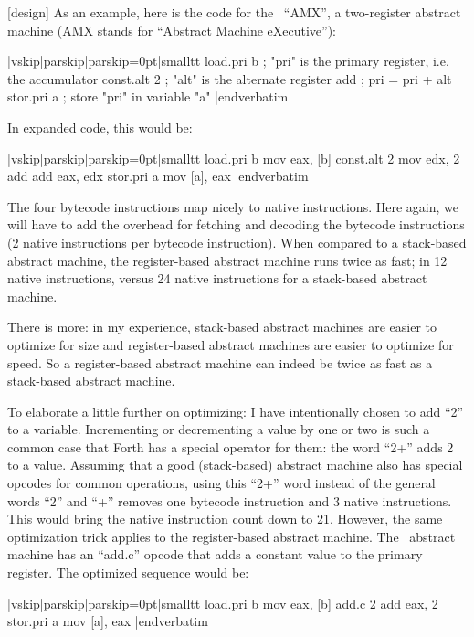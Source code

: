 [design]
As an example, here is the code for the \Small\ ``AMX'', a two-register abstract
machine (AMX stands for ``Abstract Machine eXecutive''):

\verbatim|vskip|parskip|parskip=0pt|smalltt
        load.pri    b   ; "pri" is the primary register, i.e. the accumulator
        const.alt   2   ; "alt" is the alternate register
        add             ; pri = pri + alt
        stor.pri    a   ; store "pri" in variable "a"
|endverbatim

In expanded code, this would be:

\verbatim|vskip|parskip|parskip=0pt|smalltt
        load.pri   b        mov   eax, [b]
        const.alt  2        mov   edx, 2
        add                 add   eax, edx
        stor.pri   a        mov   [a], eax
|endverbatim

The four bytecode instructions map nicely to native instructions. Here again,
we will have to add the overhead for fetching and decoding the bytecode
instructions (2 native instructions per bytecode instruction). When compared
to a stack-based abstract machine, the register-based abstract machine runs
twice as fast; in 12 native instructions, versus 24 native instructions
for a stack-based abstract machine.

There is more: in my experience, stack-based abstract machines are easier to
optimize for size and register-based abstract machines are easier to optimize
for speed. So a register-based abstract machine can indeed be twice as fast as
a stack-based abstract machine.

To elaborate a little further on optimizing: I have intentionally chosen to
add ``2'' to a variable. Incrementing or decrementing a value by one or two is
such a common case that Forth has a special operator for them: the word ``2+''
adds 2 to a value. Assuming that a good (stack-based) abstract machine also
has special opcodes for common operations, using this ``2+'' word instead of
the general words ``2'' and ``+'' removes one bytecode instruction and 3
native instructions. This would bring the native instruction count down to
21. However, the same optimization trick applies to the register-based
abstract machine. The \Small\ abstract machine has an ``add.c'' opcode that adds
a constant value to the primary register. The optimized sequence would be:

\verbatim|vskip|parskip|parskip=0pt|smalltt
        load.pri  b         mov   eax, [b]
        add.c     2         add   eax, 2
        stor.pri  a         mov   [a], eax
|endverbatim

